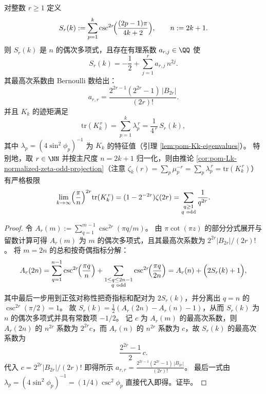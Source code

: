 \begin{proposition}\label{prop:pom-csc-moments-bernoulli}
对整数 \(r\ge 1\) 定义
\[
S_r(k):=\sum_{p=1}^{k}\csc^{2r}\!\Bigl(\frac{(2p-1)\pi}{4k+2}\Bigr),
\qquad
n:=2k+1.
\]
则 \(S_r(k)\) 是 \(n\) 的偶次多项式，且存在有理系数 \(a_{r,j}\in\QQ\) 使
\[
S_r(k)=-\frac12+\sum_{j=1}^{r} a_{r,j}\,n^{2j}.
\]
其最高次系数由 Bernoulli 数给出：
\[
a_{r,r}=\frac{2^{2r-1}(2^{2r}-1)\,|B_{2r}|}{(2r)!}.
\]
并且 \(K_k\) 的迹矩满足
\[
\mathrm{tr}(K_k^{\,r})=\sum_{p=1}^{k}\lambda_p^{\,r}=\frac{1}{4^{\,r}}\,S_r(k),
\]
其中 \(\lambda_p=(4\sin^2\phi_p)^{-1}\) 为 \(K_k\) 的特征值（引理 \ref{lem:pom-Kk-eigenvalues}）。
特别地，取 \(r\in\NN\) 并按主尺度 \(n=2k+1\) 归一化，则由推论 \ref{cor:pom-Lk-normalized-zeta-odd-projection}（注意 \(\zeta_k(r)=\sum_p\mu_p^{-r}=\sum_p\lambda_p^{\,r}=\mathrm{tr}(K_k^{\,r})\)）有严格极限
\[
\lim_{k\to\infty}\Bigl(\frac{\pi}{n}\Bigr)^{2r}\mathrm{tr}(K_k^{\,r})
=(1-2^{-2r})\zeta(2r)
=\sum_{\substack{q\ge 1\\ q\ \mathrm{odd}}}\frac{1}{q^{2r}}.
\]
\end{proposition}
\begin{proof}
令
\(
A_r(m):=\sum_{q=1}^{m-1}\csc^{2r}(\pi q/m)
\)。
由 \(\pi\cot(\pi z)\) 的部分分式展开与留数计算可得 \(A_r(m)\) 为 \(m\) 的偶次多项式，且其最高次系数为 \(2^{2r}|B_{2r}|/(2r)!\)。
将 \(m=2n\) 的总和按奇偶指标分解：
\[
A_r(2n)=\sum_{q=1}^{n-1}\csc^{2r}\!\Bigl(\frac{\pi q}{n}\Bigr)+\sum_{\substack{1\le q\le 2n-1\\ q\ \mathrm{odd}}}\csc^{2r}\!\Bigl(\frac{\pi q}{2n}\Bigr)
=A_r(n)+\Bigl(2S_r(k)+1\Bigr),
\]
其中最后一步用到正弦对称性把奇指标和配对为 \(2S_r(k)\)，并分离出 \(q=n\) 的 \(\csc^{2r}(\pi/2)=1\)。
故
\(
S_r(k)=\frac12(A_r(2n)-A_r(n)-1)
\)，从而 \(S_r(k)\) 为 \(n\) 的偶次多项式并具有常数项 \(-1/2\)。
记 \(c\) 为 \(A_r(m)\) 的最高次系数，则 \(A_r(2n)\) 的 \(n^{2r}\) 系数为 \(2^{2r}c\)，而 \(A_r(n)\) 的 \(n^{2r}\) 系数为 \(c\)，故 \(S_r(k)\) 的最高次系数为
\[
\frac{2^{2r}-1}{2}\,c.
\]
代入 \(c=2^{2r}|B_{2r}|/(2r)!\) 即得所示
\(
a_{r,r}=\frac{2^{2r-1}(2^{2r}-1)\,|B_{2r}|}{(2r)!}
\)。
最后一式由 \(\lambda_p=(4\sin^2\phi_p)^{-1}=(1/4)\csc^2\phi_p\) 直接代入即得。证毕。
\end{proof}


